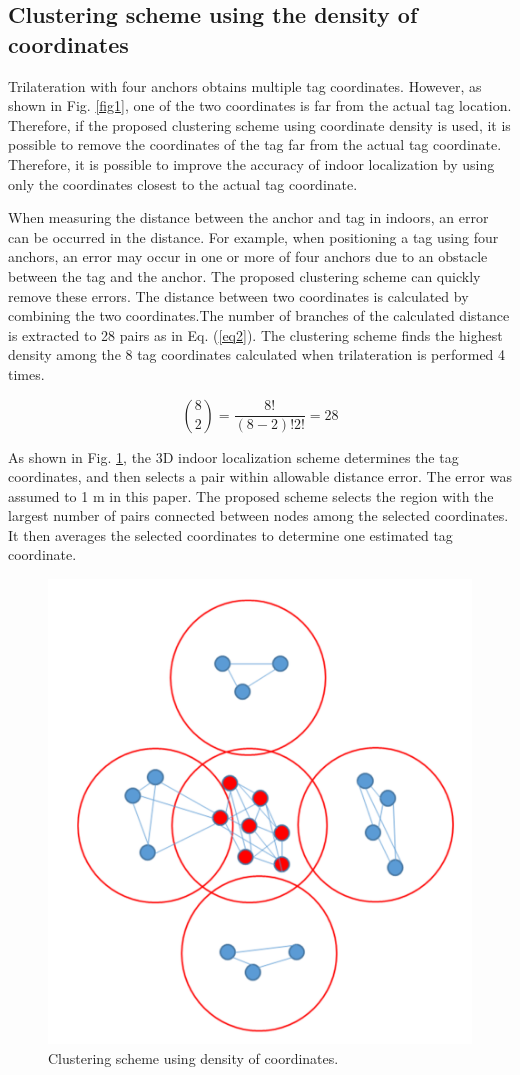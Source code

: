\documentclass[conference]{IEEEtran}
\begin{document}
\subsection{Clustering scheme using the density of coordinates}
Trilateration with four anchors obtains multiple tag coordinates. However, as shown in Fig. \ref{fig1}, one of the two coordinates is far from the actual tag location. Therefore, if the proposed clustering scheme using coordinate density is used, it is possible to remove the coordinates of the tag far from the actual tag coordinate. Therefore, it is possible to improve the accuracy of indoor localization by using only the coordinates closest to the actual tag coordinate.

When measuring the distance between the anchor and tag in indoors, an error can be occurred in the distance. For example, when positioning a tag using four anchors, an error may occur in one or more of four anchors due to an obstacle between the tag and the anchor. The proposed clustering scheme can quickly remove these errors. The distance between two coordinates is calculated by combining the two coordinates.The number of branches of the calculated distance is extracted to 28 pairs as in Eq. (\ref{eq2}). The clustering scheme finds the highest density among the 8 tag coordinates calculated when trilateration is performed 4 times.

\begin{equation}
    \binom{8}{2} = \frac{8!}{(8-2)!2!}=28\label{eq2}
\end{equation}

As shown in Fig. \ref{fig3}, the 3D indoor localization scheme determines the tag coordinates, and then selects a pair within allowable distance error. The error was assumed to 1 m in this paper. The proposed scheme selects the region with the largest number of pairs connected between nodes among the selected coordinates. It then averages the selected coordinates to determine one estimated tag coordinate.



\begin{figure}[htbp]
    \centerline{\includegraphics[width=0.7\columnwidth]{fig3.png}}
    \caption{Clustering scheme using density of coordinates.}
    \label{fig3}
\end{figure}
\end{document}
